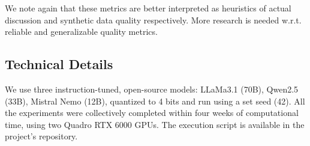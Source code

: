 We note again that these metrics are better interpreted as heuristics of actual discussion and synthetic data quality respectively. More research is needed w.r.t. reliable and generalizable quality metrics.


\subsection{Technical Details}
\label{ssec:experimental:setup}

We use three instruction-tuned, open-source models: LLaMa3.1 (70B), Qwen2.5 (33B),  Mistral Nemo (12B), quantized to 4 bits and run using a set seed (42). All the experiments were collectively completed within four weeks of computational time, using two Quadro RTX 6000 GPUs. The execution script is available in the project's repository.\analysislink 